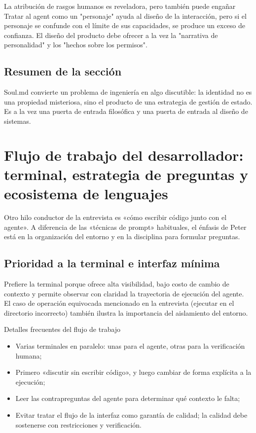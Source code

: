 \documentclass[a4paper]{article}
\begin{document}
\begin{warningbox}{La atribución de rasgos humanos es reveladora, pero también puede engañar}
Tratar al agent como un "personaje" ayuda al diseño de la interacción, pero si el personaje se confunde con el límite de sus capacidades, se produce un exceso de confianza. El diseño del producto debe ofrecer a la vez la "narrativa de personalidad" y los "hechos sobre los permisos".
\end{warningbox}

\subsection{Resumen de la sección}
Soul.md convierte un problema de ingeniería en algo discutible: la identidad no es una propiedad misteriosa, sino el producto de una estrategia de gestión de estado. Es a la vez una puerta de entrada filosófica y una puerta de entrada al diseño de sistemas.

\section{Flujo de trabajo del desarrollador: terminal, estrategia de preguntas y ecosistema de lenguajes}

Otro hilo conductor de la entrevista es «cómo escribir código junto con el agente». A diferencia de las «técnicas de prompt» habituales, el énfasis de Peter está en la organización del entorno y en la disciplina para formular preguntas.

\subsection{Prioridad a la terminal e interfaz mínima}

Prefiere la terminal porque ofrece alta visibilidad, bajo costo de cambio de contexto y permite observar con claridad la trayectoria de ejecución del agente. El caso de operación equivocada mencionado en la entrevista (ejecutar en el directorio incorrecto) también ilustra la importancia del aislamiento del entorno.

\begin{knowledgebox}{Detalles frecuentes del flujo de trabajo}
\begin{itemize}
    \item Varias terminales en paralelo: unas para el agente, otras para la verificación humana;
    \item Primero «discutir sin escribir código», y luego cambiar de forma explícita a la ejecución;
    \item Leer las contrapreguntas del agente para determinar qué contexto le falta;
    \item Evitar tratar el flujo de la interfaz como garantía de calidad; la calidad debe sostenerse con restricciones y verificación.
\end{itemize}
\end{knowledgebox}
\end{document}
